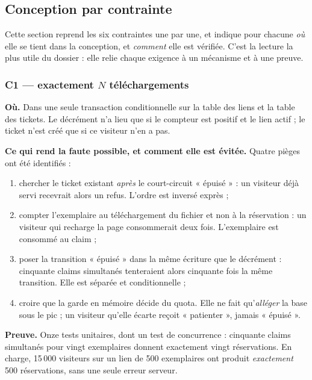 \subsection{Conception par contrainte}

Cette section reprend les six contraintes une par une, et indique pour chacune
\emph{où} elle se tient dans la conception, et \emph{comment} elle est vérifiée.
C'est la lecture la plus utile du dossier : elle relie chaque exigence à un
mécanisme et à une preuve.

\subsubsection{C1 — exactement $N$ téléchargements}

\textbf{Où.} Dans une seule transaction conditionnelle sur la table des liens et
la table des tickets. Le décrément n'a lieu que si le compteur est positif et le
lien actif ; le ticket n'est créé que si ce visiteur n'en a pas.

\textbf{Ce qui rend la faute possible, et comment elle est évitée.} Quatre
pièges ont été identifiés :

\begin{enumerate}[leftmargin=1.4em,itemsep=2pt]
  \item chercher le ticket existant \emph{après} le court-circuit « épuisé » :
        un visiteur déjà servi recevrait alors un refus. L'ordre est inversé
        exprès ;
  \item compter l'exemplaire au téléchargement du fichier et non à la
        réservation : un visiteur qui recharge la page consommerait deux fois.
        L'exemplaire est consommé au claim ;
  \item poser la transition « épuisé » dans la même écriture que le décrément :
        cinquante claims simultanés tenteraient alors cinquante fois la même
        transition. Elle est séparée et conditionnelle ;
  \item croire que la garde en mémoire décide du quota. Elle ne fait
        qu'\emph{alléger} la base sous le pic ; un visiteur qu'elle écarte reçoit
        « patienter », jamais « épuisé ».
\end{enumerate}

\textbf{Preuve.} Onze tests unitaires, dont un test de concurrence : cinquante
claims simultanés pour vingt exemplaires donnent exactement vingt réservations.
En charge, 15\,000 visiteurs sur un lien de 500 exemplaires ont produit
\emph{exactement} 500 réservations, sans une seule erreur serveur.


